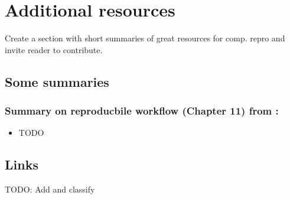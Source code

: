 \documentclass[]{book}
\providecommand{\tightlist}{%
  \setlength{\itemsep}{0pt}\setlength{\parskip}{0pt}}
\begin{document}
\hypertarget{additional-resources-1}{%
\chapter{Additional resources}\label{additional-resources-1}}

Create a section with short summaries of great resources for comp. repro and invite reader to contribute.

\hypertarget{some-summaries-1}{%
\section{Some summaries}\label{some-summaries-1}}

\hypertarget{summary-on-reproducbile-workflow-chapter-11-from-christensen2019transparent-1}{%
\subsection{\texorpdfstring{Summary on reproducbile workflow (Chapter 11) from \citet{christensen2019transparent}:}{Summary on reproducbile workflow (Chapter 11) from @christensen2019transparent:}}\label{summary-on-reproducbile-workflow-chapter-11-from-christensen2019transparent-1}}

\begin{itemize}
\tightlist
\item
  TODO
\end{itemize}

\hypertarget{links-1}{%
\section{Links}\label{links-1}}

TODO: Add and classify
\end{document}
